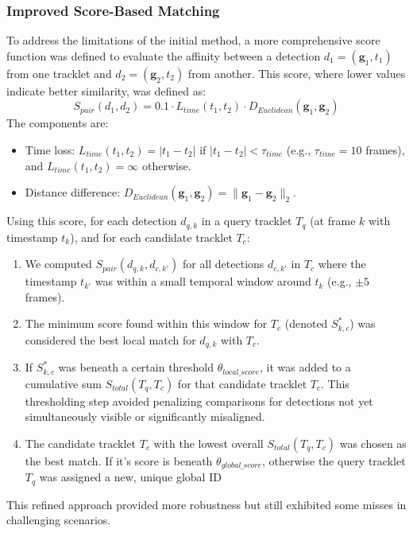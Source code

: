 \documentclass[12pt, a4paper]{article}
\begin{document}
\subsubsection{Improved Score-Based Matching}
To address the limitations of the initial method, a more comprehensive score function was defined to evaluate the affinity between a detection $d_1 = (\mathbf{g}_1, t_1)$ from one tracklet and $d_2 = (\mathbf{g}_2, t_2)$ from another. This score, where lower values indicate better similarity, was defined as:
$$ S_{pair}(d_1, d_2) = 0.1 \cdot L_{time}(t_1, t_2) \cdot D_{Euclidean}(\mathbf{g}_1, \mathbf{g}_2) $$
The components are:
\begin{itemize}
    \item Time loss: $L_{time}(t_1, t_2) = |t_1 - t_2|$ if $|t_1 - t_2| < \tau_{time}$ (e.g., $\tau_{time} = 10$ frames), and $L_{time}(t_1, t_2) = \infty$ otherwise.
    \item Distance difference: $D_{Euclidean}(\mathbf{g}_1, \mathbf{g}_2) = \| \mathbf{g}_1 - \mathbf{g}_2 \|_2$.
\end{itemize}
Using this score, for each detection $d_{q,k}$ in a query tracklet $T_q$ (at frame $k$ with timestamp $t_k$), and for each candidate tracklet $T_c$:
\begin{enumerate}
    \item We computed $S_{pair}(d_{q,k}, d_{c,k'})$ for all detections $d_{c,k'}$ in $T_c$ where the timestamp $t_{k'}$ was within a small temporal window around $t_k$ (e.g., $\pm 5$ frames).
    \item The minimum score found within this window for $T_c$ (denoted $S^*_{k,c}$) was considered the best local match for $d_{q,k}$ with $T_c$.
    \item If $S^*_{k,c}$ was beneath a certain threshold $\theta_{local\_score}$, it was added to a cumulative sum $S_{total}(T_q, T_c)$ for that candidate tracklet $T_c$. This thresholding step avoided penalizing comparisons for detections not yet simultaneously visible or significantly misaligned.
    \item The candidate tracklet $T_c$ with the lowest overall $S_{total}(T_q, T_c)$ was chosen as the best match. If it's score is beneath $\theta_{global\_score}$, otherwise the query tracklet $T_q$ was assigned a new, unique global ID
\end{enumerate}
This refined approach provided more robustness but still exhibited some misses in challenging scenarios.
\end{document}
